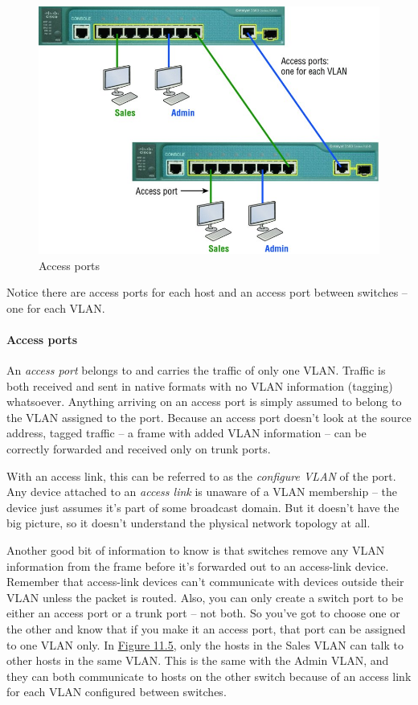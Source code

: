 \documentclass[b5paper,11pt]{memoir}
\begin{document}
\begin{figure}
   \centering
   \includegraphics{images/c11f005.jpg}
   \caption{Access ports}
   \label{fig:access-ports}
\end{figure}

Notice there are access ports for each host and an access port between switches -- one for each VLAN.

\paragraph{Access ports}
An \emph{access port} belongs to and carries the traffic of only one VLAN.
Traffic is both received and sent in native formats with no VLAN information (tagging) whatsoever.
Anything arriving on an access port is simply assumed to belong to the VLAN assigned to the port.
Because an access port doesn't look at the source address, tagged traffic -- a frame with added VLAN information -- can be correctly forwarded and received only on trunk ports.

With an access link, this can be referred to as the \emph{configure VLAN} of the port.
Any device attached to an \emph{access link} is unaware of a VLAN membership -- the device just assumes it's part of some
broadcast domain.
But it doesn't have the big picture, so it doesn't understand the physical network topology at all.

Another good bit of information to know is that switches remove any VLAN
information from the frame before it's forwarded out to an access-link
device. Remember that access-link devices can't communicate with devices
outside their VLAN unless the packet is routed. Also, you can only
create a switch port to be either an access port or a trunk port -- not
both. So you've got to choose one or the other and know that if you make
it an access port, that port can be assigned to one VLAN only. In
\protect\hyperlink{c11.xhtmlux5cux23figure11-5}{Figure 11.5}, only the
hosts in the Sales VLAN can talk to other hosts in the same VLAN. This
is the same with the Admin VLAN, and they can both communicate to hosts
on the other switch because of an access link for each VLAN configured
between switches.
\end{document}
